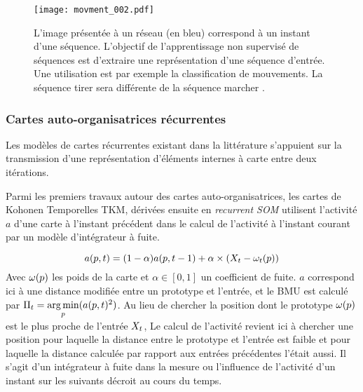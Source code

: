 \documentclass[../main]{subfiles}
\begin{document}
\begin{figure}
    \centering\texttt{[image: movment\_002.pdf]}
    \caption{L'image présentée à un réseau (en bleu) correspond à un instant d'une séquence. L'objectif de l'apprentissage non supervisé de séquences est d'extraire une représentation d'une séquence d'entrée. Une utilisation est par exemple la classification de mouvements. La séquence \og tirer \fg{} sera différente de la séquence \og marcher \fg{}.\label{fig:mouvement}}
 \end{figure}


\subsubsection{Cartes auto-organisatrices récurrentes}

Les modèles de cartes récurrentes existant dans la littérature s'appuient sur la transmission d'une représentation d'éléments internes à carte entre deux itérations.

Parmi les premiers travaux autour des cartes auto-organisatrices, les cartes de Kohonen Temporelles TKM, dérivées ensuite en \emph{recurrent SOM} \parencite{varsta_temporal_2001} utilisent l'activité $a$ d'une carte à l'instant précédent dans le calcul de l'activité à l'instant courant par un modèle d'intégrateur à fuite.

$$a(p,t) = (1-\alpha)a(p,t-1) + \alpha \times (X_t - \omega_t(p))$$
Avec $\omega(p)$ les poids de la carte et $\alpha \in [0,1]$ un coefficient de fuite.
$a$ correspond ici à une distance modifiée entre un prototype et l'entrée, et le BMU est calculé par $\Pi_t = \operatorname*{arg\,min}\limits_p(a(p,t)^2)$.
Au lieu de chercher la position dont le prototype $\omega(p)$ est le plus proche de l'entrée $X_t$, Le calcul de l'activité revient ici à chercher une position pour laquelle la distance entre le prototype et l'entrée est faible et pour laquelle la distance calculée par rapport aux entrées précédentes l'était aussi. Il s'agit d'un intégrateur à fuite dans la mesure ou l'influence de l'activité d'un instant sur les suivants décroit au cours du temps.
\end{document}
